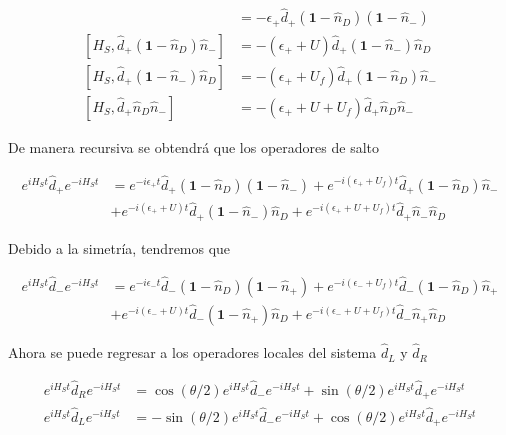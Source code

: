 \begin{appendixs}
\begin{align*}
    [H_{S},\hat{d}_{+}(\textbf{1}-\hat{n}_{D})(\textbf{1} - \hat{n}_{-})] & = - \epsilon_{+}\hat{d}_{+}(\textbf{1}-\hat{n}_{D})(\textbf{1} - \hat{n}_{-}) \\
    [H_{S},\hat{d}_{+}(\textbf{1}-\hat{n}_{D})\hat{n}_{-}] & = - (\epsilon_{+} + U)\hat{d}_{+}(\textbf{1} - \hat{n}_{-})\hat{n}_{D} \\
    [H_{S},\hat{d}_{+}(\textbf{1}-\hat{n}_{-})\hat{n}_{D}] & = - (\epsilon_{+} + U_{f})\hat{d}_{+}(\textbf{1} - \hat{n}_{D})\hat{n}_{-} \\
    [H_{S},\hat{d}_{+}\hat{n}_{D}\hat{n}_{-}] & = - (\epsilon_{+} + U + U_{f})\hat{d}_{+}\hat{n}_{D}\hat{n}_{-} 
\end{align*}

De manera recursiva se obtendrá que los operadores de salto

\begin{align*}
    e^{i H_{S}t}\hat{d}_{+}e^{-iH_{S}t} & = e^{-i\epsilon_{+}t}\hat{d}_{+}(\textbf{1}-\hat{n}_{D})(\textbf{1}-\hat{n}_{-}) + e^{-i(\epsilon_{+}+U_{f})t} \hat{d}_{+}(\textbf{1}-\hat{n}_{D})\hat{n}_{-} \\
    & + e^{-i(\epsilon_{+}+U)t}\hat{d}_{+}(\textbf{1}-\hat{n}_{-})\hat{n}_{D} + e^{-i(\epsilon_{+}+U+U_{f})t}\hat{d}_{+}\hat{n}_{-}\hat{n}_{D}
\end{align*}

Debido a la simetría, tendremos que

\begin{align*}
    e^{i H_{S}t}\hat{d}_{-}e^{-iH_{S}t} & = e^{-i\epsilon_{-}t}\hat{d}_{-}(\textbf{1}-\hat{n}_{D})(\textbf{1}-\hat{n}_{+}) + e^{-i(\epsilon_{-}+U_{f})t} \hat{d}_{-}(\textbf{1}-\hat{n}_{D})\hat{n}_{+} \\
    & + e^{-i(\epsilon_{-}+U)t}\hat{d}_{-}(\textbf{1}-\hat{n}_{+})\hat{n}_{D} + e^{-i(\epsilon_{-}+U+U_{f})t}\hat{d}_{-}\hat{n}_{+}\hat{n}_{D}
\end{align*}

Ahora se puede regresar a los operadores locales del sistema $\hat{d}_{L}$ y $\hat{d}_{R}$

\begin{align*}
    e^{iH_{S}t}\hat{d}_{R}e^{-iH_{S}t} & = \cos(\theta/2)e^{iH_{S}t}\hat{d}_{-}e^{-iH_{S}t} + \sin(\theta/2)e^{iH_{S}t}\hat{d}_{+}e^{-iH_{S}t}  \\
    e^{iH_{S}t}\hat{d}_{L}e^{-iH_{S}t} & = -\sin(\theta/2)e^{iH_{S}t}\hat{d}_{-}e^{-iH_{S}t} + \cos(\theta/2)e^{iH_{S}t}\hat{d}_{+}e^{-iH_{S}t}
\end{align*}


\end{appendixs}
